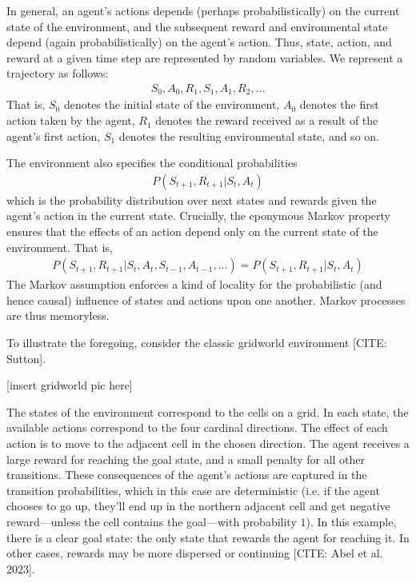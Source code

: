 In general, an agent's actions depends (perhaps probabilistically) on the current state of the environment, and the subsequent reward and environmental state depend (again probabilistically) on the agent's action.
Thus, state, action, and reward at a given time step are represented by random variables.
We represent a trajectory as follows:
\begin{align*}
	S_0, A_0, R_1, S_1, A_1, R_2, \dots
\end{align*}
That is, $S_0$ denotes the initial state of the environment, $A_0$ denotes the first action taken by the agent, $R_1$ denotes the reward received as a result of the agent's first action, $S_1$ denotes the resulting environmental state, and so on.

The environment also specifies the conditional probabilities
\begin{align*}
	P(S_{t + 1}, R_{t + 1} | S_t, A_t )
\end{align*}
which is the probability distribution over next states and rewards given the agent's action in the current state.
Crucially, the eponymous Markov property ensures that the effects of an action depend only on the current state of the environment.
That is,
\begin{align*}
	P(S_{t + 1}, R_{t + 1} | S_t, A_t, S_{t - 1}, A_{t - 1}, \dots )  = P(S_{t + 1}, R_{t + 1} | S_t, A_t )
\end{align*}
The Markov assumption enforces a kind of locality for the probabilistic (and hence causal) influence of states and actions upon one another.
Markov processes are thus memoryless.

To illustrate the foregoing, consider the classic gridworld environment [CITE: Sutton].

\begin{center}
	[insert gridworld pic here]
\end{center}

The states of the environment correspond to the cells on a grid.
In each state, the available actions correspond to the four cardinal directions.
The effect of each action is to move to the adjacent cell in the chosen direction.
The agent receives a large reward for reaching the goal state, and a small penalty for all other transitions.
These consequences of the agent's actions are captured in the transition probabilities, which in this case are deterministic (i.e. if the agent chooses to go up, they'll end up in the northern adjacent cell and get negative reward---unless the cell contains the goal---with probability $1$).
In this example, there is a clear goal state: the only state that rewards the agent for reaching it.
In other cases, rewards may be more dispersed or continuing [CITE: Abel et al. 2023].

